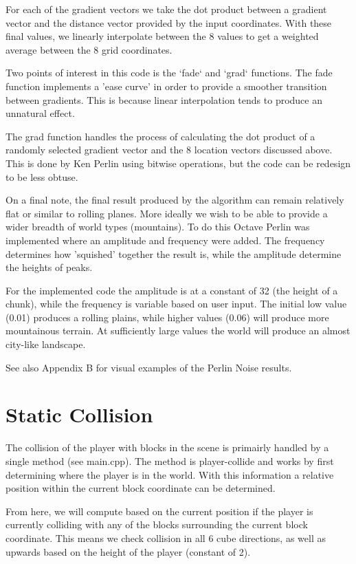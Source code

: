 \documentclass{book}
\begin{document}
For each of the gradient vectors we take the dot product between a gradient vector and the distance vector provided by the input coordinates.  With these final values, we linearly interpolate between the 8 values to get a weighted average between the 8 grid coordinates.  
    
Two points of interest in this code is the `fade` and `grad` functions.  The fade function implements a 'ease curve' in order to provide a smoother transition between gradients.  This is because linear interpolation tends to produce an unnatural effect.
    
The grad function handles the process of calculating the dot product of a randomly selected gradient vector and the 8 location vectors discussed above.  This is done by Ken Perlin using bitwise operations, but the code can be redesign to be less obtuse.
    
On a final note, the final result produced by the algorithm can remain relatively flat or similar to rolling planes.  More ideally we wish to be able to provide a wider breadth of world types (mountains).  To do this Octave Perlin was implemented where an amplitude and frequency were added.  The frequency determines how 'squished' together the result is, while the amplitude determine the heights of peaks.
    
For the implemented code the amplitude is at a constant of 32 (the height of a chunk), while the frequency is variable based on user input.  The initial low value (0.01) produces a rolling plains, while higher values (0.06) will produce more mountainous terrain.  At sufficiently large values the world will produce an almost city-like landscape.
    
See also Appendix B for visual examples of the Perlin Noise results.
    
\section{Static Collision}
    
The collision of the player with blocks in the scene is primairly handled by a single method (see main.cpp).  The method is player-collide and works by first determining where the player is in the world.  With this information a relative position within the current block coordinate can be determined.  
    
From here, we will compute based on the current position if the player is currently colliding with any of the blocks surrounding the current block coordinate.  This means we check collision in all 6 cube directions, as well as upwards based on the height of the player (constant of 2).
    
\end{document}
